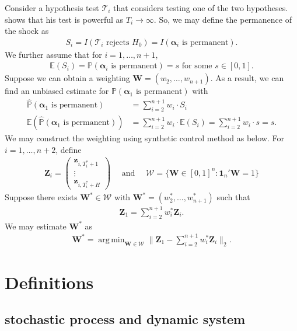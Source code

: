 \documentclass[12pt]{article}
\def\mbf#1{\mathbf{#1}} %
\def\mc#1{\mathcal{#1}} %
\DeclareMathOperator*{\argmin}{arg\,min} %
\def\E{\mathbb{E}} %
\def\mc#1{\mathcal{#1}}
\def\bs#1{\boldsymbol{#1}}
\def\P{\mathbb{P}}
\theoremstyle{definition}
\theoremstyle{definition}
\begin{document}
Consider a hypothesis test $\mc{T}_i$ that considers testing one of the two hypotheses.  \cite{quaedvlieg2021multi} shows that his test is powerful as $T_i \to \infty$. So, we may define the permanence of the shock as
\begin{align*}
  S_i = I(\mc{T}_i \text{ rejects }H_0)= I(\bs{\alpha}_i \text{ is permanent}).
\end{align*}
We further assume that for $i = 1, \ldots, n+1$,
\begin{align*}
  \E (S_i) = \P(\bs{\alpha}_i \text{ is permanent})=s
\text{ for some } s\in [0,1].
\end{align*}
Suppose we can obtain a weighting $\mathbf{W} = (w_2, \ldots, w_{n+1})$. As a result, we can find an unbiased estimate for $ \P(\bs{\alpha}_1 \text{ is permanent})$ with
\begin{align*}
\hat{ \P}(\bs{\alpha}_1 \text{ is permanent})
  &= \sum_{i=2}^{n+1} w_i \cdot S_i \\
 \E ( \hat{ \P}(\bs{\alpha}_1 \text{ is permanent}))
 &= 
 \sum_{i=2}^{n+1} w_i\cdot  \E (S_i)= \sum_{i=2}^{n+1} w_i \cdot  s = s.
\end{align*}
We may construct the weighting using synthetic control method as below. 
For $i=1, \ldots, n+2$, define  
\begin{align*}
  \mathbf{Z}_{i} 
  = \begin{pmatrix}
    \mbf{z}_{i, T_i^*+1} \\ 
    \vdots \\
    \mbf{z}_{i, T_i^*+H}
  \end{pmatrix}
  \quad 
  \text{ and } \quad 
  \mc{W}=\{\mathbf{W}\in [0,1]^n \colon \mathbf{1}_n'\mathbf{W}=1\}
\end{align*}
Suppose there exists $\mathbf{W}^*\in \mc{W}$ with $\mathbf{W}^* = (w_{2}^*, \ldots, w_{n+1}^*)$ such that
\begin{align*}
  \mathbf{Z}_1 = \sum_{i=2}^{n+1} w_i^* \mathbf{Z}_{i}.
\end{align*}
We may estimate $\mathbf{W}^*$ as
\begin{align*}
  \mathbf{W}^* 
  = \argmin_{\mathbf{W}\in \mc{W}}
  \|  \mathbf{Z}_1-\sum_{i=2}^{n+1} w_i^* \mathbf{Z}_{i} \|_2.
\end{align*}


\section{Definitions}


\subsection{stochastic process and dynamic system}
\end{document}

